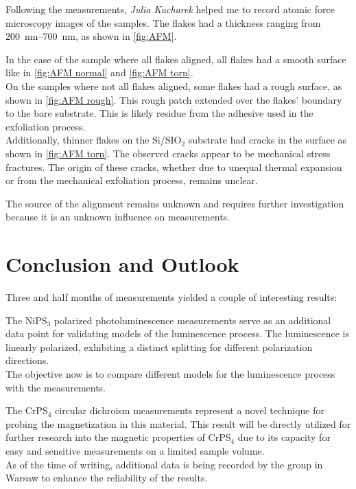 \documentclass[
	oneside,
	parskip=half,
	a4paper,
]{scrbook}
\begin{document}
Following the measurements, \textit{Julia Kucharek} helped me to record atomic force microscopy images of the samples.
The flakes had a thickness ranging from \SIrange{200}{700}{nm}, as shown in \autoref{fig:AFM}.

In the case of the sample where all flakes aligned, all flakes had a smooth surface like in \autoref{fig:AFM normal} and \autoref{fig:AFM torn}.\\
On the samples where not all flakes aligned, some flakes had a rough surface, as shown in \autoref{fig:AFM rough}.
This rough patch extended over the flakes' boundary to the bare substrate.
This is likely residue from the adhesive used in the exfoliation process.\\
Additionally, thinner flakes on the Si/SIO$_2$ substrate had cracks in the surface as shown in \autoref{fig:AFM torn}.
The observed cracks appear to be mechanical stress fractures.
The origin of these cracks, whether due to unequal thermal expansion or from the mechanical exfoliation process, remains unclear. 

The source of the alignment remains unknown and requires further investigation because it is an unknown influence on measurements. 

\chapter{Conclusion and Outlook}
Three and half months of measurements yielded a couple of interesting results:

The NiPS$_3$ polarized photoluminescence measurements serve as an additional data point for validating models of the luminescence process.
The luminescence is linearly polarized, exhibiting a distinct splitting for different polarization directions.\\
The objective now is to compare different models for the luminescence process \cite{NiPS3_coherent, MPX_first_principles} with the measurements. 

The CrPS$_4$ circular dichroism measurements represent a novel technique for probing the magnetization in this material.
This result will be directly utilized for further research into the magnetic properties of CrPS$_4$ due to its capacity for easy and sensitive measurements on a limited sample volume.\\
As of the time of writing, additional data is being recorded by the group in Warsaw to enhance the reliability of the results.
\end{document}
